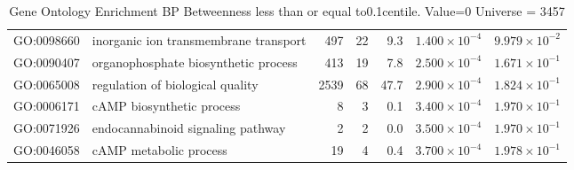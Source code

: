 \begin{table}[ht]
\begin{adjustbox}{width=\textwidth}
\begin{tabular}{llrrrrr}
  GO:0098660 & inorganic ion transmembrane transport & 497 & 22 & 9.3 & $1.400 \times 10^{-4}$ & $9.979 \times 10^{-2}$ \\ 
  GO:0090407 & organophosphate biosynthetic process & 413 & 19 & 7.8 & $2.500 \times 10^{-4}$ & $1.671 \times 10^{-1}$ \\ 
  GO:0065008 & regulation of biological quality & 2539 & 68 & 47.7 & $2.900 \times 10^{-4}$ & $1.824 \times 10^{-1}$ \\ 
  GO:0006171 & cAMP biosynthetic process & 8 & 3 & 0.1 & $3.400 \times 10^{-4}$ & $1.970 \times 10^{-1}$ \\ 
  GO:0071926 & endocannabinoid signaling pathway & 2 & 2 & 0.0 & $3.500 \times 10^{-4}$ & $1.970 \times 10^{-1}$ \\ 
  GO:0046058 & cAMP metabolic process & 19 & 4 & 0.4 & $3.700 \times 10^{-4}$ & $1.978 \times 10^{-1}$ \\ 
   \hline
\end{tabular}
\end{adjustbox}
\caption{Gene Ontology Enrichment BP Betweenness  less than or equal to0.1centile.   Value=0 Universe = 3457} 
\label{tab:Gene Ontology Enrichment BP Betweenness  less than or equal to0.1centile.   Value=0 Universe = 3457}
\end{table}

